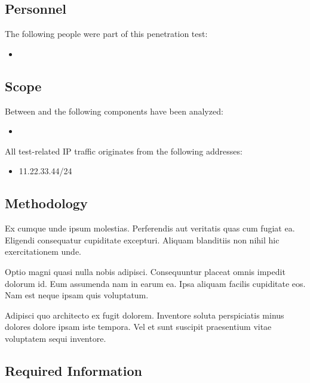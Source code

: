 \documentclass[a4paper]{article}
\begin{document}
\subsection{Personnel}

The following people were part of this penetration test:

\begin{itemize}
    \item {}
\end{itemize}

\subsection{Scope}

Between  and  the following components have been analyzed:

\begin{itemize}
    \item {}
\end{itemize}

All test-related IP traffic originates from the following addresses:

\begin{itemize}
  \item 11.22.33.44/24
\end{itemize}

\subsection{Methodology}

Ex cumque unde ipsum molestias.
Perferendis aut veritatis quas cum fugiat ea.
Eligendi consequatur cupiditate excepturi.
Aliquam blanditiis non nihil hic exercitationem unde.

Optio magni quasi nulla nobis adipisci.
Consequuntur placeat omnis impedit dolorum id.
Eum assumenda nam in earum ea.
Ipsa aliquam facilis cupiditate eos.
Nam est neque ipsam quis voluptatum.

Adipisci quo architecto ex fugit dolorem.
Inventore soluta perspiciatis minus dolores dolore ipsam iste tempora.
Vel et sunt suscipit praesentium vitae voluptatem sequi inventore.

  \subsection{Required Information}
\end{document}
